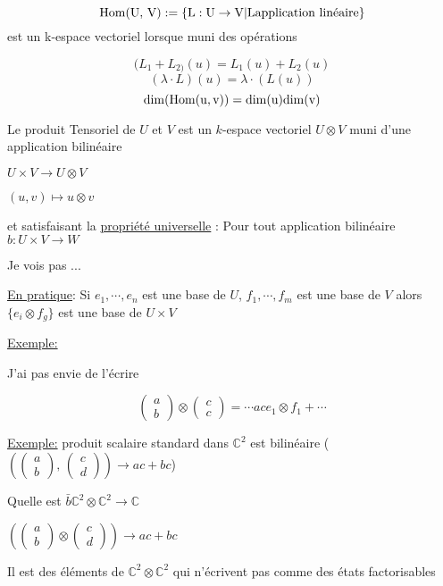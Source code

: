 \[ \rm{Hom}(U,\, V) := \{ L:U \to V | L \text{application linéaire}  \}  \] est un k-espace vectoriel lorsque muni des opérations

\[ (L_1 + L_{2)} (u) = L_1 (u) + L_2 (u) \]
\[ (\lambda\cdot L ) (u) = \lambda \cdot (L(u)) \]
\[ \rm{dim}(\rm{Hom} (u,v)) = \rm{dim} (u) \rm{dim} (v) \]
	
Le produit Tensoriel de $U$ et $V$ est un $k$-espace vectoriel $U \otimes V$ muni d'une application bilinéaire 

$U \times V \to U \otimes V$

$(u,v) \mapsto u \otimes v$

et satisfaisant la \underline{propriété universelle} : Pour tout application bilinéaire $b: U \times V \to W$

Je vois pas ... 


\underline{En pratique}: Si $e_1 , \dotsb , e_n $ est une base de $U$, $f_1, \dotsb, f_m $ est une base de $V$ alors $\{ e_i \otimes f_g \} $ est une base de $U \times V$ 

\underline{Exemple:} 

J'ai pas envie de l'écrire

\[ \begin{pmatrix} a \\b  \end{pmatrix} \otimes \begin{pmatrix} c \\ c \end{pmatrix} = \dotsb ac e_1 \otimes f_1  + \dotsb \]

\underline{Exemple:}  produit scalaire standard dans $\mathds{C}^{2}$ est bilinéaire ($(\begin{pmatrix} a\\b \end{pmatrix},\, \begin{pmatrix} c\\d \end{pmatrix} ) \to ac+ bc$)

Quelle est $\bar b \mathds{C}^{2} \otimes \mathds{C}^{2} \to \mathbb{C}$

$(\begin{pmatrix} a\\b \end{pmatrix} \otimes \begin{pmatrix} c\\d \end{pmatrix} ) \to ac+ bc$

\begin{tcolorbox}[title=Attention]
	Il est des éléments de $\mathds{C}^{2} \otimes \mathds{C}^{2}$ qui n'écrivent pas comme des états factorisables 
\end{tcolorbox}





